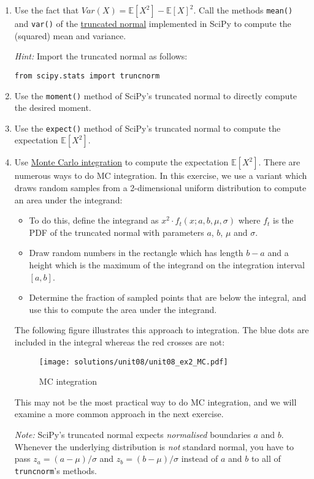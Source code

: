 \documentclass{scrartcl}
\providecommand{\tightlist}{%
      \setlength{\itemsep}{0pt}\setlength{\parskip}{0pt}}
\begin{document}
\begin{enumerate}
\def\labelenumi{\arabic{enumi}.}
\item
  Use the fact that \(Var(X) = \mathbb{E}[X^2] - \mathbb{E}[X]^2\). Call
  the methods \texttt{mean()} and \texttt{var()} of the
  \href{https://docs.scipy.org/doc/scipy/reference/generated/scipy.stats.truncnorm.html}{truncated
  normal} implemented in SciPy to compute the (squared) mean and
  variance.

  \emph{Hint:} Import the truncated normal as follows:

\begin{verbatim}
from scipy.stats import truncnorm
\end{verbatim}
\item
  Use the \texttt{moment()} method of SciPy's truncated normal to
  directly compute the desired moment.
\item
  Use the \texttt{expect()} method of SciPy's truncated normal to
  compute the expectation \(\mathbb{E}[X^2]\).
\item
  Use \href{https://en.wikipedia.org/wiki/Monte_Carlo_integration}{Monte
  Carlo integration} to compute the expectation \(\mathbb{E}[X^2]\).
  There are numerous ways to do MC integration. In this exercise, we use
  a variant which draws random samples from a 2-dimensional uniform
  distribution to compute an area under the integrand:

  \begin{itemize}
  \tightlist
  \item
    To do this, define the integrand as
    \(x^2 \cdot f_t(x;a,b,\mu,\sigma)\) where \(f_t\) is the PDF of the
    truncated normal with parameters \(a\), \(b\), \(\mu\) and
    \(\sigma\).
  \item
    Draw random numbers in the rectangle which has length \(b-a\) and a
    height which is the maximum of the integrand on the integration
    interval \([a,b]\).
  \item
    Determine the fraction of sampled points that are below the
    integral, and use this to compute the area under the integrand.
  \end{itemize}

  The following figure illustrates this approach to integration. The
  blue dots are included in the integral whereas the red crosses are
  not:

  \begin{figure}
  \centering
  \texttt{[image: solutions/unit08/unit08\_ex2\_MC.pdf]}
  \caption{MC integration}
  \end{figure}

  This may not be the most practical way to do MC integration, and we
  will examine a more common approach in the next exercise.

  \emph{Note:} SciPy's truncated normal expects \emph{normalised}
  boundaries \(a\) and \(b\). Whenever the underlying distribution is
  \emph{not} standard normal, you have to pass \(z_a = (a-\mu)/\sigma\)
  and \(z_b = (b-\mu)/\sigma\) instead of \(a\) and \(b\) to all of
  \texttt{truncnorm}'s methods.
\end{enumerate}
\end{document}
